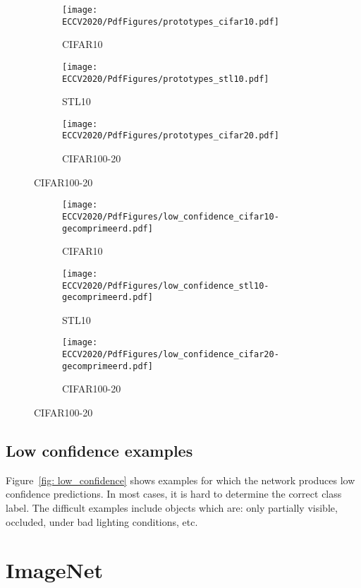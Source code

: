 \documentclass[runningheads]{llncs}
\begin{document}
\begin{figure}
    \centering
    \caption{Prototype images on the smaller datasets.}
    \label{fig:prototypes}
    \begin{subfigure}{\textwidth} \caption{CIFAR10}
    \texttt{[image: ECCV2020/PdfFigures/prototypes\_cifar10.pdf]}
    \end{subfigure}
    \newline
    \begin{subfigure}{\textwidth} \caption{STL10}
    \texttt{[image: ECCV2020/PdfFigures/prototypes\_stl10.pdf]}
    \end{subfigure}
    \begin{subfigure}{\textwidth} \caption{CIFAR100-20}
    \texttt{[image: ECCV2020/PdfFigures/prototypes\_cifar20.pdf]}
    \end{subfigure}
\end{figure}
\begin{figure}
    \centering
    \caption{Low confidence predictions.}
    \label{fig: low_confidence}
    \begin{subfigure}{\textwidth} \caption{CIFAR10}
    \texttt{[image: ECCV2020/PdfFigures/low\_confidence\_cifar10-gecomprimeerd.pdf]}
    \end{subfigure}
    \newline
    \begin{subfigure}{\textwidth} \caption{STL10}
    \texttt{[image: ECCV2020/PdfFigures/low\_confidence\_stl10-gecomprimeerd.pdf]}
    \end{subfigure}
    \begin{subfigure}{\textwidth} \caption{CIFAR100-20}
    \texttt{[image: ECCV2020/PdfFigures/low\_confidence\_cifar20-gecomprimeerd.pdf]}
    \end{subfigure}
\end{figure}

\subsection{Low confidence examples}
Figure~\ref{fig: low_confidence} shows examples for which the network produces low confidence predictions. In most cases, it is hard to determine the correct class label. The difficult examples include objects which are: only partially visible, occluded, under bad lighting conditions, etc.

\section{ImageNet}
\end{document}
